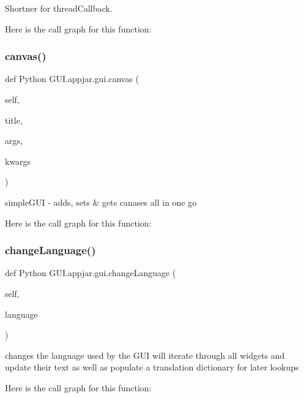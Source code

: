 \begin{DoxyVerb}Shortner for threadCallback.\end{DoxyVerb}
 Here is the call graph for this function\+:
\mbox{\label{class_python_01_g_u_i_1_1appjar_1_1gui_a99bb9230f919ddb5d2c40dec98e8688b}} 
\subsubsection{\texorpdfstring{canvas()}{canvas()}}
{\footnotesize\ttfamily def Python G\+U\+I.\+appjar.\+gui.\+canvas (\begin{DoxyParamCaption}\item[{}]{self,  }\item[{}]{title,  }\item[{}]{args,  }\item[{}]{kwargs }\end{DoxyParamCaption})}

\begin{DoxyVerb}simpleGUI - adds, sets & gets canases all in one go \end{DoxyVerb}
 Here is the call graph for this function\+:
\mbox{\label{class_python_01_g_u_i_1_1appjar_1_1gui_ac1088d844cb4dc3cca7716ac5568d593}} 
\subsubsection{\texorpdfstring{change\+Language()}{changeLanguage()}}
{\footnotesize\ttfamily def Python G\+U\+I.\+appjar.\+gui.\+change\+Language (\begin{DoxyParamCaption}\item[{}]{self,  }\item[{}]{language }\end{DoxyParamCaption})}

\begin{DoxyVerb}changes the language used by the GUI
    will iterate through all widgets and update their text
    as well as populate a translation dictionary for later lookups \end{DoxyVerb}
 Here is the call graph for this function\+:
\mbox{\label{class_python_01_g_u_i_1_1appjar_1_1gui_a95d775949847e150b567e7df0ef2e256}} 
